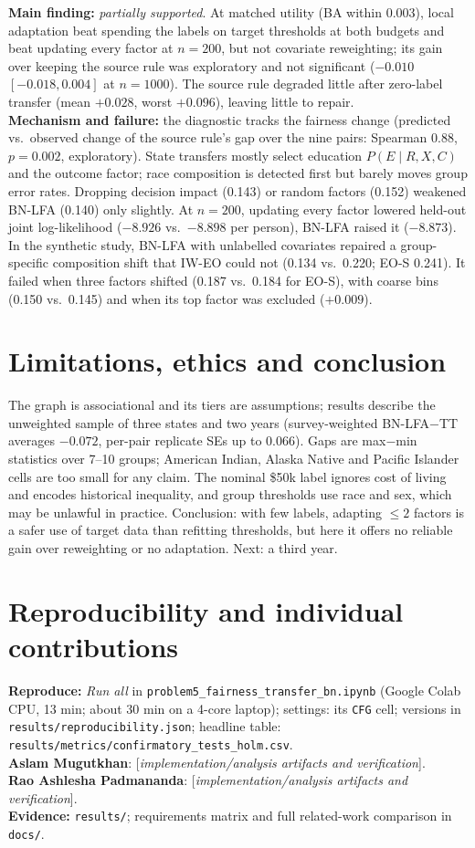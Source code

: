 \documentclass[11pt,a4paper]{article}
\newcommand{\fillin}[1]{\textnormal{[\textit{#1}]}}
\begin{document}
\textbf{Main finding:} \emph{partially supported}. At matched utility (BA within 0.003), local adaptation beat spending
the labels on target thresholds at both budgets and beat updating every factor at $n=200$, but not covariate
reweighting; its gain over keeping the source rule was exploratory and not significant ($-0.010$ $[-0.018,0.004]$ at
$n=1000$). The source rule degraded little after zero-label transfer (mean $+0.028$, worst $+0.096$), leaving little to
repair.\\
\textbf{Mechanism and failure:} the diagnostic tracks the fairness change (predicted vs.\ observed change of the source
rule's gap over the nine pairs: Spearman 0.88, $p=0.002$, exploratory). State transfers mostly select education
$P(E\mid R,X,C)$ and the outcome factor; race composition is detected first but barely moves group error rates. Dropping
decision impact (0.143) or random factors (0.152) weakened BN-LFA (0.140) only slightly. At $n=200$, updating every
factor lowered held-out joint log-likelihood ($-8.926$ vs.\ $-8.898$ per person), BN-LFA raised it ($-8.873$). In the
synthetic study, BN-LFA with unlabelled covariates repaired a group-specific composition shift that IW-EO could not
(0.134 vs.\ 0.220; EO-S 0.241). It failed when three factors shifted (0.187 vs.\ 0.184 for EO-S), with coarse bins
(0.150 vs.\ 0.145) and when its top factor was excluded ($+0.009$).

\section{Limitations, ethics and conclusion}
The graph is associational and its tiers are assumptions; results describe the unweighted sample of three states and
two years (survey-weighted BN-LFA$-$TT averages $-0.072$, per-pair replicate SEs up to 0.066). Gaps are max$-$min
statistics over 7--10 groups; American Indian, Alaska Native and Pacific Islander cells are too small for any claim. The
nominal \$50k label ignores cost of living and encodes historical inequality, and group thresholds use race and sex,
which may be unlawful in practice. Conclusion: with few labels, adapting $\le2$ factors is a safer use of target data
than refitting thresholds, but here it offers no reliable gain over reweighting or no adaptation. Next: a third year.

\section*{Reproducibility and individual contributions}
\textbf{Reproduce:} \emph{Run all} in \texttt{problem5\_fairness\_transfer\_bn.ipynb} (Google Colab CPU, 13 min;
about 30 min on a 4-core laptop); settings: its \texttt{CFG} cell; versions in
\texttt{results/reproducibility.json}; headline table: \texttt{results/metrics/confirmatory\_tests\_holm.csv}.\\
\textbf{Aslam Mugutkhan}: \fillin{implementation/analysis artifacts and verification}.\\
\textbf{Rao Ashlesha Padmananda}: \fillin{implementation/analysis artifacts and verification}.\\
\textbf{Evidence:} \texttt{results/}; requirements matrix and full related-work comparison in \texttt{docs/}.
\end{document}
